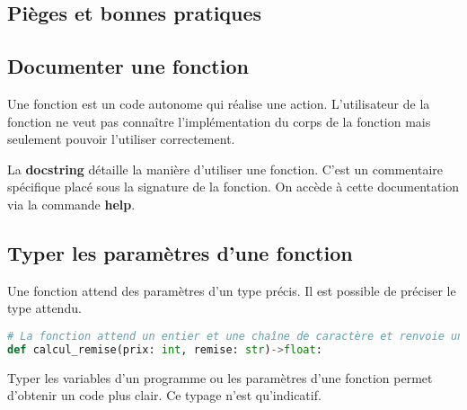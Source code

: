 \documentclass[a4paper,11pt]{article}
\begin{document}
\begin{Form}
\section{Pièges et bonnes pratiques}
\subsection{Documenter une fonction}
Une fonction est un code autonome qui réalise une action. L'utilisateur de la fonction ne veut pas connaître l'implémentation du corps de la fonction mais seulement pouvoir l'utiliser correctement.
\begin{aretenir}[]
La \textbf{docstring} détaille la manière d'utiliser une fonction. C'est un commentaire spécifique placé sous la signature de la fonction. On accède à cette documentation via la commande \textbf{help}.
\end{aretenir}
\subsection{Typer les paramètres d'une fonction}
Une fonction attend des paramètres d'un type précis. Il est possible de préciser le type attendu.
\begin{center}
\begin{lstlisting}[language=Python]
# La fonction attend un entier et une chaîne de caractère et renvoie un flottant
def calcul_remise(prix: int, remise: str)->float:
\end{lstlisting}
\label{moncode}
\end{center}
\begin{aretenir}[]
Typer les variables d'un programme ou les paramètres d'une fonction permet d'obtenir un code plus clair. Ce typage n'est qu'indicatif.
\end{aretenir}

\end{Form}
\end{document}
